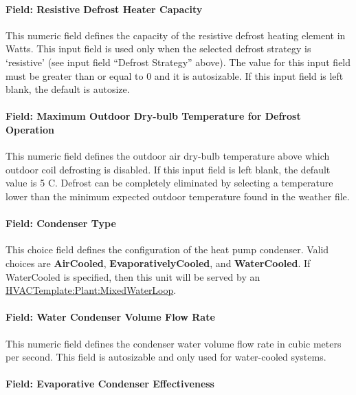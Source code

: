 \paragraph{Field: Resistive Defrost Heater Capacity}\label{field-resistive-defrost-heater-capacity-000}

This numeric field defines the capacity of the resistive defrost heating element in Watts. This input field is used only when the selected defrost strategy is `resistive' (see input field ``Defrost Strategy'' above). The value for this input field must be greater than or equal to 0 and it is autosizable. If this input field is left blank, the default is autosize.

\paragraph{Field: Maximum Outdoor Dry-bulb Temperature for Defrost Operation}\label{field-maximum-outdoor-dry-bulb-temperature-for-defrost-operation-000}

This numeric field defines the outdoor air dry-bulb temperature above which outdoor coil defrosting is disabled. If this input field is left blank, the default value is 5 C. Defrost can be completely eliminated by selecting a temperature lower than the minimum expected outdoor temperature found in the weather file.

\paragraph{Field: Condenser Type}\label{field-condenser-type-000}

This choice field defines the configuration of the heat pump condenser. Valid choices are \textbf{AirCooled}, \textbf{EvaporativelyCooled}, and \textbf{WaterCooled}. If WaterCooled is specified, then this unit will be served by an \hyperref[hvactemplateplantmixedwaterloop]{HVACTemplate:Plant:MixedWaterLoop}.

\paragraph{Field: Water Condenser Volume Flow Rate}\label{field-water-condenser-volume-flow-rate}

This numeric field defines the condenser water volume flow rate in cubic meters per second. This field is autosizable and only used for water-cooled systems.

\paragraph{Field: Evaporative Condenser Effectiveness}\label{field-evaporative-condenser-effectiveness-000}


